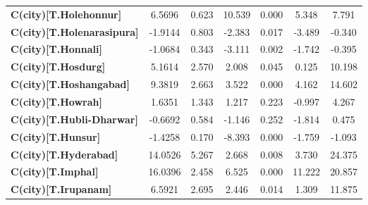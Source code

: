 \begin{center}
\begin{tabular}{lcccccc}
\textbf{C(city)[T.Holehonnur]}                                                                      &       6.5696  &        0.623     &    10.539  &         0.000        &        5.348    &        7.791     \\
\textbf{C(city)[T.Holenarasipura]}                                                                  &      -1.9144  &        0.803     &    -2.383  &         0.017        &       -3.489    &       -0.340     \\
\textbf{C(city)[T.Honnali]}                                                                         &      -1.0684  &        0.343     &    -3.111  &         0.002        &       -1.742    &       -0.395     \\
\textbf{C(city)[T.Hosdurg]}                                                                         &       5.1614  &        2.570     &     2.008  &         0.045        &        0.125    &       10.198     \\
\textbf{C(city)[T.Hoshangabad]}                                                                     &       9.3819  &        2.663     &     3.522  &         0.000        &        4.162    &       14.602     \\
\textbf{C(city)[T.Howrah]}                                                                          &       1.6351  &        1.343     &     1.217  &         0.223        &       -0.997    &        4.267     \\
\textbf{C(city)[T.Hubli-Dharwar]}                                                                   &      -0.6692  &        0.584     &    -1.146  &         0.252        &       -1.814    &        0.475     \\
\textbf{C(city)[T.Hunsur]}                                                                          &      -1.4258  &        0.170     &    -8.393  &         0.000        &       -1.759    &       -1.093     \\
\textbf{C(city)[T.Hyderabad]}                                                                       &      14.0526  &        5.267     &     2.668  &         0.008        &        3.730    &       24.375     \\
\textbf{C(city)[T.Imphal]}                                                                          &      16.0396  &        2.458     &     6.525  &         0.000        &       11.222    &       20.857     \\
\textbf{C(city)[T.Irupanam]}                                                                        &       6.5921  &        2.695     &     2.446  &         0.014        &        1.309    &       11.875     \\

\end{tabular}
\end{center}
